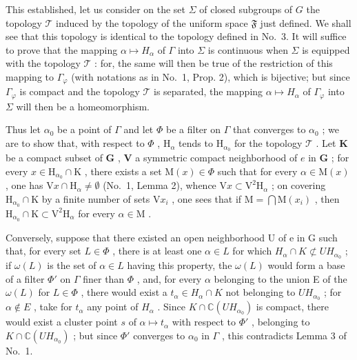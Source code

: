 This established, let us consider on the set \(\Sigma\) of closed subgroups of \(G\) the topology \(\mathcal{T}\) induced by the topology of the uniform space \(\mathfrak{F}\) just defined. We shall see that this topology is identical to the topology defined in No.~3. It will suffice to prove that the mapping \(\alpha \mapsto H_{\alpha}\) of \(\Gamma\) into \(\Sigma\) is continuous when \(\Sigma\) is equipped with the topology \(\mathcal{T}\) : for, the same will then be true of the restriction of this mapping to \(\Gamma_{\varphi}\) (with notations as in No.~1, Prop. 2), which is bijective; but since \(\Gamma_{\varphi}\) is compact and the topology \(\mathcal{T}\) is separated, the mapping \(\alpha \mapsto H_{\alpha}\) of \(\Gamma_{\varphi}\) into \(\Sigma\) will then be a homeomorphism.

Thus let \(\alpha_0\) be a point of \(\Gamma\) and let \(\Phi\) be a filter on \(\Gamma\) that converges to \(\alpha_0\) ; we are to show that, with respect to \(\Phi\) , \(\mathrm{H}_{\alpha}\) tends to \(\mathrm{H}_{\alpha_0}\) for the topology \(\mathcal{T}\) . Let \(\mathbf{K}\) be a compact subset of \(\mathbf{G}\) , \(\mathbf{V}\) a symmetric compact neighborhood of \(e\) in \(\mathbf{G}\) ; for every \(x \in \mathrm{H}_{\alpha_0} \cap \mathrm{K}\) , there exists a set \(\mathrm{M}(x) \in \Phi\) such that for every \(\alpha \in \mathrm{M}(x)\) , one has \(\mathrm{V}x \cap \mathrm{H}_{\alpha} \neq \emptyset\) (No.~1, Lemma 2), whence \(\mathrm{V}x \subset \mathrm{V}^2\mathrm{H}_{\alpha}\) ; on covering \(\mathrm{H}_{\alpha_0} \cap \mathrm{K}\) by a finite number of sets \(\mathrm{V}x_i\) , one sees that if \(\mathrm{M} = \bigcap \mathrm{M}(x_i)\) , then \(\mathrm{H}_{\alpha_0} \cap \mathrm{K} \subset \mathrm{V}^2\mathrm{H}_{\alpha}\) for every \(\alpha \in \mathrm{M}\) .

Conversely, suppose that there existed an open neighborhood U of e in G such that, for every set \(L \in \Phi\) , there is at least one \(\alpha \in L\) for which \(H_{\alpha} \cap K \not\subset UH_{\alpha_{0}}\) ; if \(\omega(L)\) is the set of \(\alpha \in L\) having this property, the \(\omega(L)\) would form a base of a filter \(\Phi'\) on \(\Gamma\) finer than \(\Phi\) , and, for every \(\alpha\) belonging to the union E of the \(\omega(L)\) for \(L \in \Phi\) , there would exist a \(t_{\alpha} \in H_{\alpha} \cap K\) not belonging to \(UH_{\alpha_0}\) ; for \(\alpha \notin E\) , take for \(t_{\alpha}\) any point of \(H_{\alpha}\) . Since \(K \cap \mathbb{C}(UH_{\alpha_0})\) is compact, there would exist a cluster point \(s\) of \(\alpha \mapsto t_{\alpha}\) with respect to \(\Phi'\) , belonging to \(K \cap \mathbb{C}(UH_{\alpha_0})\) ; but since \(\Phi'\) converges to \(\alpha_0\) in \(\Gamma\) , this contradicts Lemma 3 of No.~1.

